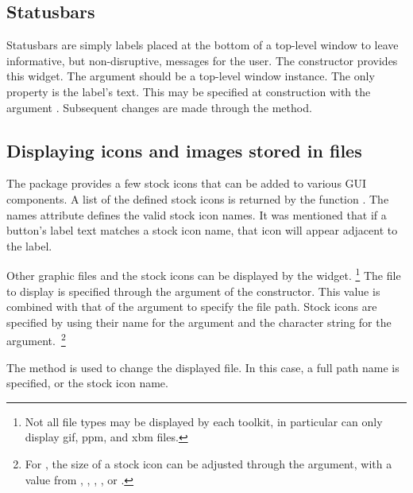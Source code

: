 \subsection{Statusbars}
\label{sec:gWidgets-statusbars}

Statusbars are simply labels placed at the bottom of a top-level window to leave
informative, but non-disruptive, messages for the user.  The
 constructor provides this widget.  The
 argument should be a top-level window instance. 
The only property is the label's text. This may be specified at
construction with the argument
. Subsequent changes are made through
the  method. 




\subsection{Displaying icons and images stored in files}
\label{sec:gWidgets-displ-icons-imag}

The  package provides a few stock icons that can be
added to various GUI components. A list of the defined stock icons is
returned by the function .  The names attribute
defines the valid stock icon names. It was mentioned that if a
button's label text matches a stock icon name, that icon will appear
adjacent to the label.



Other graphic files and the stock icons can be displayed by the
 widget. \footnote{Not all file types may be
  displayed by each toolkit, in particular  can
  only display gif, ppm, and xbm files.} The file to display is
specified through the  argument of the
constructor. This value is combined with that of the
 argument to specify the file path.  Stock
icons are specified by using their name for the 
argument and the character string  for the
 argument.~\footnote{For , the size
  of a stock icon can be adjusted through the 
  argument, with a value from , ,
  , , or .}

The  method is used to change the
displayed file. In this case, a full path name is specified, or the
stock icon name.


